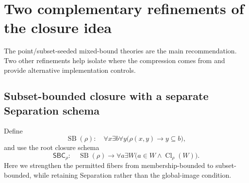 \documentclass[11pt,letterpaper]{article}
\theoremstyle{definition}\newtheorem{definition}[theorem]{Definition}
\theoremstyle{remark}\newtheorem{remark}[theorem]{Remark}
\newcommand{\SBC}{\mathsf{SBC}}
\newcommand{\SB}{\operatorname{SB}}
\newcommand{\Cl}{\operatorname{Cl}}
\begin{document}
\section{Two complementary refinements of the closure idea}
\label{sec:otherkernels}

The point/subset-seeded mixed-bound theories are the main recommendation.
Two other refinements help isolate where the compression comes from and
provide alternative implementation controls.

\subsection{Subset-bounded closure with a separate Separation schema}

Define
\begin{equation}\label{eq:SB}
 \SB(\rho):\quad
 \forall x\exists b\forall y\bigl(\rho(x,y)\to y\subseteq b\bigr),
\end{equation}
and use the root closure schema
\begin{equation}\label{eq:SBC}
 \SBC_\rho:\quad
 \SB(\rho)\to\forall a\exists W
 \bigl(a\in W\land\Cl_\rho(W)\bigr).
\end{equation}
Here we strengthen the permitted fibers from membership-bounded to
subset-bounded, while retaining Separation rather than the global-image
condition.
\end{document}
